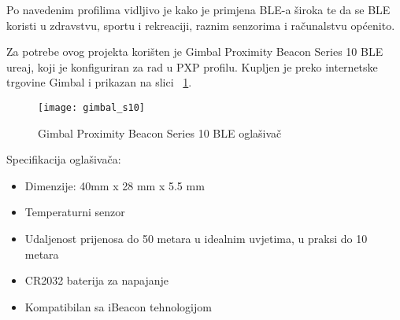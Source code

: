 Po navedenim profilima vidljivo je kako je primjena BLE-a \v{s}iroka te da se BLE koristi u zdravstvu, sportu i rekreaciji, raznim senzorima i ra\v{c}unalstvu op\'{c}enito.

Za potrebe ovog projekta kori\v{s}ten je Gimbal Proximity Beacon Series 10 BLE ure\dj aj, koji je konfiguriran za rad u PXP profilu. Kupljen je preko internetske trgovine Gimbal \cite{gimbal_beacon} i prikazan na slici ~\ref{fig:gimbal_oglasivac}.

\begin{figure}[!htbp]
	\begin{center}
 \texttt{[image: gimbal\_s10]}
 \caption{Gimbal Proximity Beacon Series 10 BLE ogla\v{s}iva\v{c}}
 \label{fig:gimbal_oglasivac}
	\end{center}
\end{figure}

Specifikacija ogla\v{s}iva\v{c}a:


\begin{itemize}
	\item Dimenzije: 40mm x 28 mm x 5.5 mm
	\item Temperaturni senzor
	\item Udaljenost prijenosa do 50 metara u idealnim uvjetima, u praksi do 10 metara
	\item CR2032 baterija za napajanje
	\item Kompatibilan sa iBeacon tehnologijom

\end{itemize}

